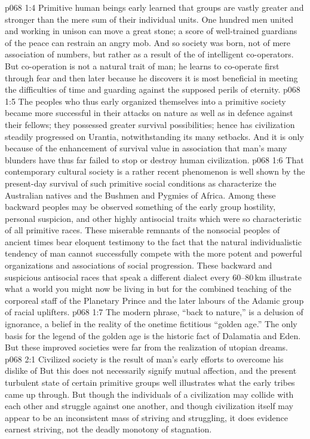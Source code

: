 \vs p068 1:4 \pc Primitive human beings early learned that groups are vastly greater and stronger than the mere sum of their individual units. One hundred men united and working in unison can move a great stone; a score of well\hyp{}trained guardians of the peace can restrain an angry mob. And so society was born, not of mere association of numbers, but rather as a result of the  of intelligent co\hyp{}operators. But co\hyp{}operation is not a natural trait of man; he learns to co\hyp{}operate first through fear and then later because he discovers it is most beneficial in meeting the difficulties of time and guarding against the supposed perils of eternity.
\vs p068 1:5 The peoples who thus early organized themselves into a primitive society became more successful in their attacks on nature as well as in defence against their fellows; they possessed greater survival possibilities; hence has civilization steadily progressed on Urantia, notwithstanding its many setbacks. And it is only because of the enhancement of survival value in association that man’s many blunders have thus far failed to stop or destroy human civilization.
\vs p068 1:6 \pc That contemporary cultural society is a rather recent phenomenon is well shown by the present\hyp{}day survival of such primitive social conditions as characterize the Australian natives and the Bushmen and Pygmies of Africa. Among these backward peoples may be observed something of the early group hostility, personal suspicion, and other highly antisocial traits which were so characteristic of all primitive races. These miserable remnants of the nonsocial peoples of ancient times bear eloquent testimony to the fact that the natural individualistic tendency of man cannot successfully compete with the more potent and powerful organizations and associations of social progression. These backward and suspicious antisocial races that speak a different dialect every 60--80\,km illustrate what a world you might now be living in but for the combined teaching of the corporeal staff of the Planetary Prince and the later labours of the Adamic group of racial uplifters.
\vs p068 1:7 The modern phrase, “back to nature,” is a delusion of ignorance, a belief in the reality of the onetime fictitious “golden age.” The only basis for the legend of the golden age is the historic fact of Dalamatia and Eden. But these improved societies were far from the realization of utopian dreams.
\vs p068 2:1 Civilized society is the result of man’s early efforts to overcome his dislike of  But this does not necessarily signify mutual affection, and the present turbulent state of certain primitive groups well illustrates what the early tribes came up through. But though the individuals of a civilization may collide with each other and struggle against one another, and though civilization itself may appear to be an inconsistent mass of striving and struggling, it does evidence earnest striving, not the deadly monotony of stagnation.
